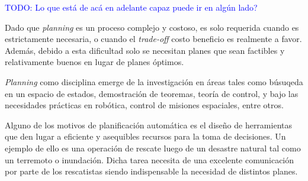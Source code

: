 \textcolor{blue}{TODO: Lo que está de acá en adelante capaz puede ir en algún lado?}

Dado que \emph{planning} es un proceso complejo y costoso, es solo requerida
cuando es estrictamente necesaria, o cuando el \emph{trade-off} costo beneficio
es realmente a favor. Además, debido a esta dificultad solo se necesitan planes
que sean factibles y relativamente buenos en lugar de planes óptimos.

\emph{Planning} como disciplina emerge de la investigación en áreas tales como
búsuqeda en un espacio de estados, demostración de teoremas, teoría de control,
y bajo las necesidades prácticas en robótica, control de misiones espaciales,
entre otros.

Alguno de los motivos de planificación automática es el diseño de herramientas
que den lugar a eficiente y asequibles recursos para la toma de decisiones. Un
ejemplo de ello es una operación de rescate luego de un desastre natural tal
como un terremoto o inundación. Dicha tarea necesita de una excelente
comunicación por parte de los rescatistas siendo indispensable la necesidad de
distintos planes.